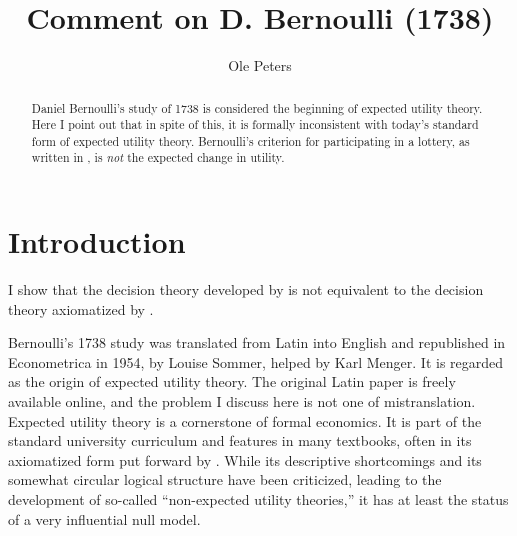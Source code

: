 \documentclass[final]{ectaart}
\newcommand{\seclabel}[1]{\label{section:#1}}
\theoremstyle{plain}
\begin{document}
\begin{frontmatter}

\title{Comment on D. Bernoulli (1738)}
\author{Ole Peters}
\address{
\small London Mathematical Laboratory, 8 Margravine Gardens, London W6 8RH, UK\\
\small Santa Fe Institute, 1399 Hyde Park Road, Santa Fe, 87501 NM, USA\\
\small E-mail: o.peters@lml.org.uk}


\begin{abstract}
Daniel Bernoulli's study of 1738 \cite{Bernoulli1738} is considered the beginning of expected utility theory. Here I point out that in spite of this, it is formally inconsistent with today's standard form of expected utility theory. Bernoulli's criterion for participating in a lottery, as written in \cite{Bernoulli1738}, is {\it not} the expected change in utility. 
\end{abstract}

\end{frontmatter}
 
\section{Introduction}
\seclabel{Historical}
I show that the decision theory developed by \citet{Bernoulli1738} is not equivalent to the decision theory axiomatized by \citet{vonNeumannMorgenstern1944}.

Bernoulli's 1738 study was translated from Latin into English and republished in Econometrica in 1954, by Louise Sommer, helped by Karl Menger.
It is regarded as the origin of expected utility theory. The original Latin paper is freely available online, and the problem I discuss here is not one of mistranslation. Expected utility theory is a cornerstone of formal economics. It is part of the standard university curriculum and features in many textbooks, often in its axiomatized form put forward by \cite{vonNeumannMorgenstern1944}. While its descriptive shortcomings and its somewhat circular logical structure have been criticized, leading to the development of so-called ``non-expected utility theories,'' it has at least the status of a very influential null model.
\end{document}
